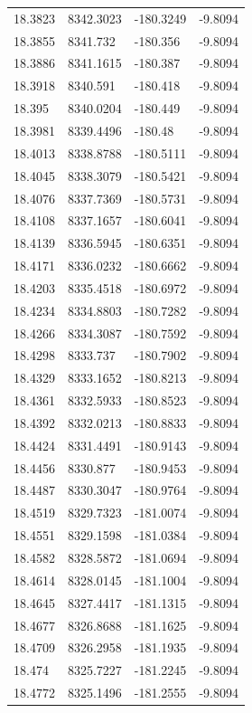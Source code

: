 \begin{table}[H]
\begin{tabular}{llll}
18.3823 & 8342.3023 & -180.3249 & -9.8094 \\
18.3855 & 8341.732 & -180.356 & -9.8094 \\
18.3886 & 8341.1615 & -180.387 & -9.8094 \\
18.3918 & 8340.591 & -180.418 & -9.8094 \\
18.395 & 8340.0204 & -180.449 & -9.8094 \\
18.3981 & 8339.4496 & -180.48 & -9.8094 \\
18.4013 & 8338.8788 & -180.5111 & -9.8094 \\
18.4045 & 8338.3079 & -180.5421 & -9.8094 \\
18.4076 & 8337.7369 & -180.5731 & -9.8094 \\
18.4108 & 8337.1657 & -180.6041 & -9.8094 \\
18.4139 & 8336.5945 & -180.6351 & -9.8094 \\
18.4171 & 8336.0232 & -180.6662 & -9.8094 \\
18.4203 & 8335.4518 & -180.6972 & -9.8094 \\
18.4234 & 8334.8803 & -180.7282 & -9.8094 \\
18.4266 & 8334.3087 & -180.7592 & -9.8094 \\
18.4298 & 8333.737 & -180.7902 & -9.8094 \\
18.4329 & 8333.1652 & -180.8213 & -9.8094 \\
18.4361 & 8332.5933 & -180.8523 & -9.8094 \\
18.4392 & 8332.0213 & -180.8833 & -9.8094 \\
18.4424 & 8331.4491 & -180.9143 & -9.8094 \\
18.4456 & 8330.877 & -180.9453 & -9.8094 \\
18.4487 & 8330.3047 & -180.9764 & -9.8094 \\
18.4519 & 8329.7323 & -181.0074 & -9.8094 \\
18.4551 & 8329.1598 & -181.0384 & -9.8094 \\
18.4582 & 8328.5872 & -181.0694 & -9.8094 \\
18.4614 & 8328.0145 & -181.1004 & -9.8094 \\
18.4645 & 8327.4417 & -181.1315 & -9.8094 \\
18.4677 & 8326.8688 & -181.1625 & -9.8094 \\
18.4709 & 8326.2958 & -181.1935 & -9.8094 \\
18.474 & 8325.7227 & -181.2245 & -9.8094 \\
18.4772 & 8325.1496 & -181.2555 & -9.8094 \\

\end{tabular}
\end{table}
